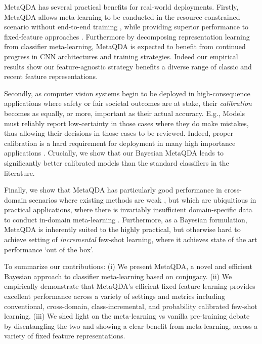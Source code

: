\documentclass[10pt,twocolumn,letterpaper]{article}
\begin{document}
MetaQDA has several practical benefits for real-world deployments. Firstly, MetaQDA allows meta-learning to be conducted in the resource constrained scenario without end-to-end training \cite{ignatov2019aiSmartphone}, while providing superior performance to fixed-feature approaches \cite{wang2019simpleshot,chen2019closerfewshot,mangla2020charting}. Furthermore by decomposing representation learning from classifier meta-learning, MetaQDA is expected to benefit from continued progress in CNN architectures and training strategies. Indeed our empirical results show our feature-agnostic strategy benefits a diverse range of classic and recent feature representations.

Secondly, as computer vision systems begin to be deployed in high-consequence applications where safety  \cite{Kuper2018TowardNetworks}
or fair societal outcomes \cite{Du2019FairnessPerspective} are at stake, their \emph{calibration} becomes as equally, or more, important as their actual accuracy. E.g., Models must reliably report low-certainty in those cases where they do make mistakes, thus allowing their decisions in those cases to be reviewed. Indeed, proper calibration is a hard requirement for deployment in many high importance applications \cite{guo2017calibration,nixon2019measuring}. Crucially, we show that our Bayesian MetaQDA leads to significantly better calibrated models than the standard classifiers in the literature. 

Finally, we show that MetaQDA has particularly good performance in {cross-domain} scenarios where existing methods are weak \cite{chen2019closerfewshot}, but which are ubiquitious in practical applications, where there is invariably insufficient domain-specific data to conduct in-domain meta-learning \cite{guo2020boarder}. Furthermore, as a Bayesian formulation, MetaQDA is inherently suited to the highly practical, but otherwise hard to achieve setting of \emph{incremental} \cite{tao2020few,rebuffi2017icarl} few-shot learning, where it achieves state of the art performance `out of the box'.


To summarize our contributions: (i) We present MetaQDA, a novel and efficient Bayesian approach to classifier meta-learning based on conjugacy. (ii) We empirically demonstrate that MetaQDA's efficient fixed feature learning provides excellent performance across a variety of settings and metrics including conventional, cross-domain, class-incremental, and probability calibrated few-shot learning. (iii) We shed light on the meta-learning vs vanilla pre-training debate by disentangling the two and showing a clear benefit from meta-learning, across a variety of fixed feature representations.
\end{document}
